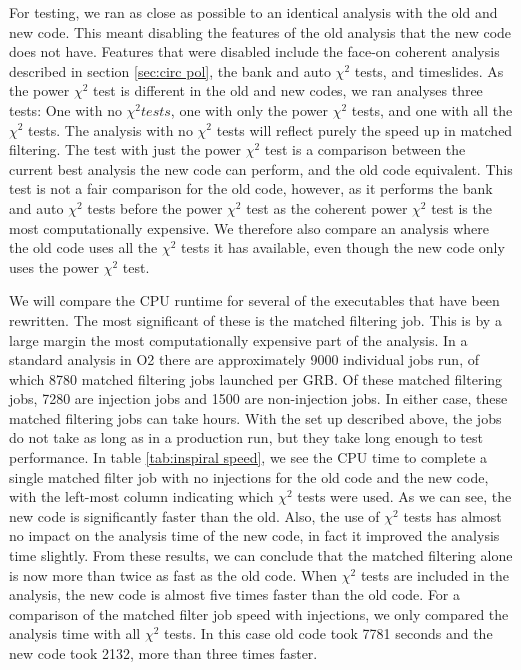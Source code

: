 \documentclass[11pt]{cuthesis}
\begin{document}
For testing, we ran as close as possible to an identical analysis with the old and new code. This meant disabling the features of the old analysis that the new code does not have. Features that were disabled include the face-on coherent analysis described in section \ref{sec:circ pol}, the bank and auto $\chi^2$ tests, and timeslides. As the power $\chi^2$ test is different in the old and new codes, we ran analyses three tests: One with no $\chi^2 tests$, one with only the power $\chi^2$ tests, and one with all the $\chi^2$ tests. The analysis with no $\chi^2$ tests will reflect purely the speed up in matched filtering. The test with just the power $\chi^2$ test is a comparison between the current best analysis the new code can perform, and the old code equivalent. This test is not a fair comparison for the old code, however, as it performs the bank and auto $\chi^2$ tests before the power $\chi^2$ test as the coherent power $\chi^2$ test is the most computationally expensive. We therefore also compare an analysis where the old code uses all the $\chi^2$ tests it has available, even though the new code only uses the power $\chi^2$ test. 

We will compare the CPU runtime for several of the executables that have been rewritten. The most significant of these is the matched filtering job. This is by a large margin the most computationally expensive part of the analysis. In a standard analysis in O2 there are approximately 9000 individual jobs run, of which 8780 matched filtering jobs launched per GRB. Of these matched filtering jobs, 7280 are injection jobs and 1500 are non-injection jobs. In either case, these matched filtering jobs can take hours. With the set up described above, the jobs do not take as long as in a production run, but they take long enough to test performance. In table \ref{tab:inspiral speed}, we see the CPU time to complete a single matched filter job with no injections for the old code and the new code, with the left-most column indicating which $\chi^2$ tests were used. As we can see, the new code is significantly faster than the old. Also, the use of $\chi^2$ tests has almost no impact on the analysis time of the new code, in fact it improved the analysis time slightly. From these results, we can conclude that the matched filtering alone is now more than twice as fast as the old code. When $\chi^2$ tests are included in the analysis, the new code is almost five times faster than the old code. For a comparison of the matched filter job speed with injections, we only compared the analysis time with all $\chi^2$ tests. In this case old code took 7781 seconds and the new code took 2132, more than three times faster.  
\end{document}
